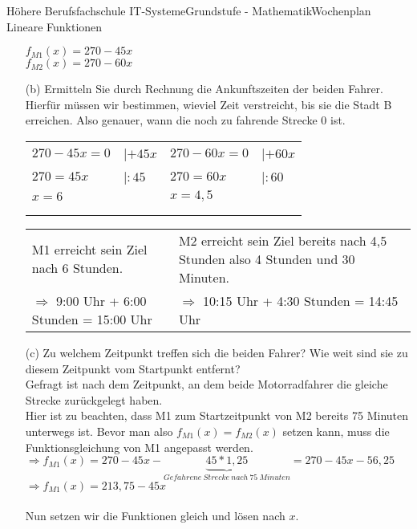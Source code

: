 \documentclass[oneside,openany,headings=optiontotoc,11pt,numbers=noenddot]{scrreprt}
\begin{document}
\begin{worksheet}{Höhere Berufsfachschule IT-Systeme}{Grundstufe - Mathematik}{Wochenplan Lineare Funktionen}
\begin{framed}
\begin{itemize}
				\colorbox{green!10}{\(f_{M1}(x) = 270 - 45x\)}\\
				\colorbox{green!10}{\(f_{M2}(x) = 270 - 60x\)}\\
				\item[(b)] Ermitteln Sie durch Rechnung die Ankunftszeiten der beiden Fahrer.\\
				Hierfür müssen wir bestimmen, wieviel Zeit verstreicht, bis sie die Stadt B erreichen. Also genauer, wann die noch zu fahrende Strecke \(0\) ist.\\
				\par\noindent
				\begin{tabularx}{0.8\textwidth}{Xl|Xl}
					\(270 - 45x = 0\) & |\(+45x\) & \(270 - 60x = 0\) & |\(+60x\)\\
					\(270 = 45x\) & |\(:45\) & \(270 = 60x\) & |\(:60\)\\
					\(x = 6\) & & \(x=4,5\)\\
					\\
					\hline
					\\
				\end{tabularx}
				\begin{tabularx}{0.8\textwidth}{L{5.7cm}|L{5.7cm}}
					M1 erreicht sein Ziel nach 6 Stunden. & M2 erreicht sein Ziel bereits nach 4,5 Stunden also 4 Stunden und 30 Minuten.\\
					$\Rightarrow$ 9:00 Uhr + 6:00 Stunden = \colorbox{green!10}{15:00 Uhr} & $\Rightarrow$ 10:15 Uhr + 4:30 Stunden = \colorbox{green!10}{14:45 Uhr}
				\end{tabularx}
				\item[(c)] Zu welchem Zeitpunkt treffen sich die beiden Fahrer? Wie weit sind sie zu diesem Zeitpunkt vom Startpunkt entfernt?\\
				Gefragt ist nach dem Zeitpunkt, an dem beide Motorradfahrer die gleiche Strecke zurückgelegt haben.\\
				Hier ist zu beachten, dass M1 zum Startzeitpunkt von M2 bereits 75 Minuten unterwegs ist. Bevor man also \(f_{M1}(x) = f_{M2}(x)\) setzen kann, muss die Funktionsgleichung von M1 angepasst werden.\\
				\(\Rightarrow f_{M1}(x) = 270 - 45x - \underbrace{45*1,25}_{Gefahrene\ Strecke\ nach\ 75\ Minuten} = 270 - 45x - 56,25\)\\
				\(\Rightarrow f_{M1}(x) = 213,75 - 45x\)\\
				\\
				Nun setzen wir die Funktionen gleich und lösen nach \(x\).\\

\end{itemize}
\end{framed}
\end{worksheet}
\end{document}
